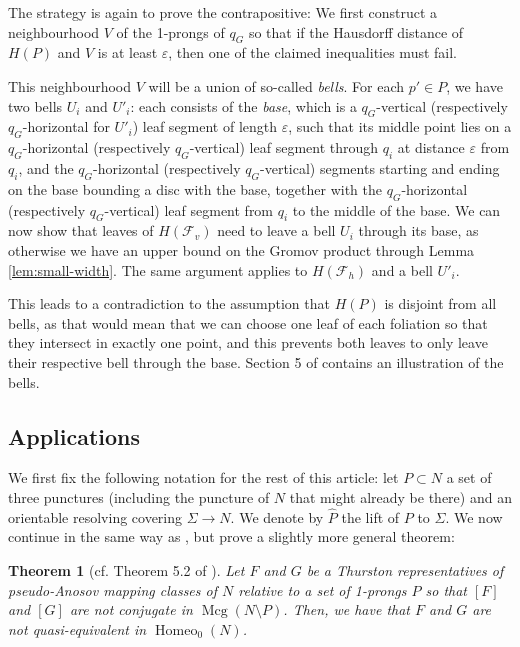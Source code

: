 \documentclass[10pt,a4paper]{amsart}
\let\epsilon\varepsilon
\newtheorem{theorem}{Theorem}[section]
\begin{document}
The strategy is again to prove the contrapositive:
We first construct a neighbourhood $V$ of the 1-prongs of $q_G$ so that if the Hausdorff distance of $H(P)$ and $V$ is at least $\epsilon$, then one of the claimed inequalities must fail.

This neighbourhood $V$ will be a union of so-called \emph{bells}.
For each $p'\in P$, we have two bells $U_i$ and $U'_i$:
each consists of the \emph{base}, which is a $q_G$-vertical (respectively $q_G$-horizontal for $U'_i$) leaf segment of length $\epsilon$, such that its middle point lies on a $q_G$-horizontal (respectively $q_G$-vertical) leaf segment through $q_i$ at distance $\epsilon$ from $q_i$, and the $q_G$-horizontal (respectively $q_G$-vertical) segments starting and ending on the base bounding a disc with the base, together with the $q_G$-horizontal (respectively $q_G$-vertical) leaf segment from $q_i$ to the middle of the base.
We can now show that leaves of $H(\mathcal{F}_v)$ need to leave a bell $U_i$ through its base, as otherwise we have an upper bound on the Gromov product through Lemma \ref{lem:small-width}.
The same argument applies to $H(\mathcal{F}_h)$ and a bell $U'_i$.

This leads to a contradiction to the assumption that $H(P)$ is disjoint from all bells, as that would mean that we can choose one leaf of each foliation so that they intersect in exactly one point, and this prevents both leaves to only leave their respective bell through the base.
Section 5 of \cite{BHW2} contains an illustration of the bells.

\subsection{Applications}
We first fix the following notation for the rest of this article:
let $P\subset N$ a set of three punctures (including the puncture of $N$ that might already be there) and an orientable resolving covering $\Sigma\rightarrow N$.
We denote by $\hat{P}$ the lift of $P$ to $\Sigma$.
We now continue in the same way as \cite{BHW2}, but prove a slightly more general theorem:


\begin{theorem}[cf. Theorem 5.2 of \cite{BHW2}]\label{thm:main-thing}
    Let $F$ and $G$ be a Thurston representatives of pseudo-Anosov mapping classes of $N$ relative to a set of 1-prongs $P$ so that $[F]$ and $[G]$ are not conjugate in $\operatorname{Mcg}(N\setminus P)$.
    Then, we have that $F$ and $G$ are not quasi-equivalent in $\operatorname{Homeo}_0(N)$.
\end{theorem}
\end{document}
